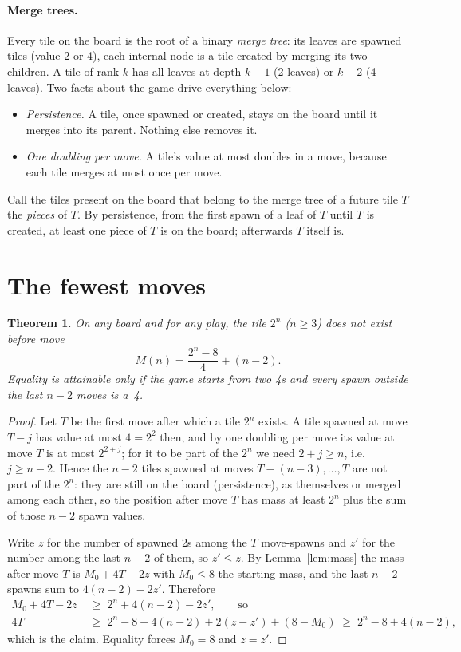 \documentclass[11pt]{article}
\newtheorem{theorem}{Theorem}
\theoremstyle{definition}
\theoremstyle{remark}
\begin{document}
\paragraph{Merge trees.} Every tile on the board is the root of a binary
\emph{merge tree}: its leaves are spawned tiles (value 2 or 4), each
internal node is a tile created by merging its two children. A tile of
rank $k$ has all leaves at depth $k-1$ (2-leaves) or $k-2$ (4-leaves). Two
facts about the game drive everything below:
\begin{itemize}[nosep]
\item \emph{Persistence.} A tile, once spawned or created, stays on the
board until it merges into its parent. Nothing else removes it.
\item \emph{One doubling per move.} A tile's value at most doubles in a
move, because each tile merges at most once per move.
\end{itemize}
Call the tiles present on the board that belong to the merge tree of a
future tile $T$ the \emph{pieces} of $T$. By persistence, from the first
spawn of a leaf of $T$ until $T$ is created, at least one piece of $T$ is
on the board; afterwards $T$ itself is.

\section{The fewest moves}

\begin{theorem}\label{thm:moves}
On any board and for any play, the tile $2^n$ ($n\ge3$) does not exist
before move
\[
M(n)=\frac{2^n-8}{4}+(n-2).
\]
Equality is attainable only if the game starts from two 4s and every spawn
outside the last $n-2$ moves is a~4.
\end{theorem}
\begin{proof}
Let $T$ be the first move after which a tile $2^n$ exists. A tile spawned
at move $T-j$ has value at most $4=2^2$ then, and by one doubling per move
its value at move $T$ is at most $2^{2+j}$; for it to be part of the $2^n$
we need $2+j\ge n$, i.e.\ $j\ge n-2$. Hence the $n-2$ tiles spawned at
moves $T-(n-3),\dots,T$ are not part of the $2^n$: they are still on the
board (persistence), as themselves or merged among each other, so the
position after move $T$ has mass at least $2^n$ plus the sum of those
$n-2$ spawn values.

Write $z$ for the number of spawned 2s among the $T$ move-spawns and $z'$
for the number among the last $n-2$ of them, so $z'\le z$. By
Lemma~\ref{lem:mass} the mass after move $T$ is $M_0+4T-2z$ with
$M_0\le8$ the starting mass, and the last $n-2$ spawns sum to $4(n-2)-2z'$.
Therefore
\begin{align*}
M_0+4T-2z\;&\ge\;2^n+4(n-2)-2z',\qquad\text{so}\\
4T\;&\ge\;2^n-8+4(n-2)+2(z-z')+(8-M_0)\;\ge\;2^n-8+4(n-2),
\end{align*}
which is the claim. Equality forces $M_0=8$ and $z=z'$.
\end{proof}
\end{document}
